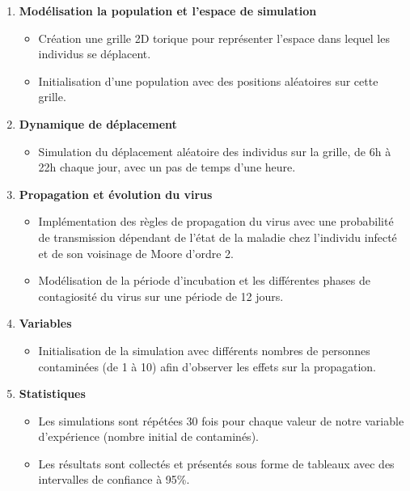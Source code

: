 \documentclass[12pt,french,titlepage]{article}
\begin{document}
\begin{enumerate}

\item \textbf{Modélisation la population et l'espace de simulation}
\begin{itemize}
\item Création une grille 2D torique pour représenter l'espace dans lequel les individus se déplacent.
\item Initialisation d'une population avec des positions aléatoires sur cette grille.
\end{itemize}

\item \textbf{Dynamique de déplacement}
\begin{itemize}
\item Simulation du déplacement aléatoire des individus sur la grille, de 6h à 22h chaque jour, avec un pas de temps d'une heure.
\end{itemize}

\item \textbf{Propagation et évolution du virus}
\begin{itemize}
\item Implémentation des règles de propagation du virus avec une probabilité de transmission dépendant de l'état de la maladie chez l'individu infecté et de son voisinage de Moore d'ordre 2.
\item Modélisation de la période d'incubation et les différentes phases de contagiosité du virus sur une période de 12 jours.
\end{itemize}

\item \textbf{Variables}
\begin{itemize}
\item Initialisation de la simulation avec différents nombres de personnes contaminées (de 1 à 10) afin d'observer les effets sur la propagation.
\end{itemize}

\item \textbf{Statistiques}
\begin{itemize}
\item Les simulations sont répétées 30 fois pour chaque valeur de notre variable d'expérience (nombre initial de contaminés).
\item Les résultats sont collectés et présentés sous forme de tableaux avec des intervalles de confiance à 95\%.
\end{itemize}

\end{enumerate}
 
\end{document}
